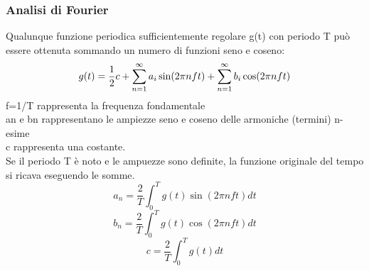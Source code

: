 \documentclass{article}
\begin{document}
		\subsubsection{Analisi di Fourier}
		Qualunque funzione periodica sufficientemente regolare g(t) con periodo T può essere ottenuta sommando un numero di funzioni seno e coseno: \\
		\begin{equation}
			g(t) = \frac{1}{2}c+\sum_{n=1}^\infty a_i\sin (2\pi nft)+\sum_{n=1}^\infty b_i\cos (2\pi nft)\\
		\end{equation}
		f=1/T rappresenta la frequenza fondamentale \\ 
		a\ped n e b\ped n rappresentano le ampiezze seno e coseno delle armoniche (termini) n-esime\\
		c rappresenta una costante.\\
		Se il periodo T è noto e le ampuezze sono definite, la funzione originale del tempo si ricava eseguendo le somme.\\
				\begin{equation}
			a_n=\frac{2}{T} \int_{0}^{T}g(t)\sin (2\pi nft) dt			
		\end{equation}
		\begin{equation}
			b_n=\frac{2}{T} \int_{0}^{T}g(t)\cos(2\pi nft)dt
		\end{equation}
		\begin{equation}
			c=\frac{2}{T} \int_{0}^{T}g(t)dt
		\end{equation}
\end{document}
